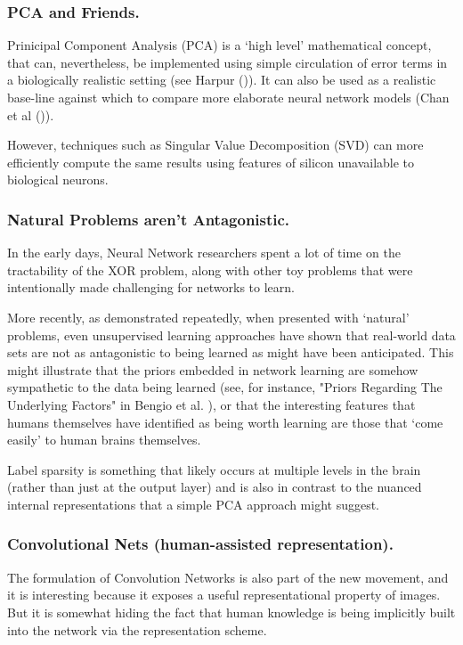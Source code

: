 \documentclass[citeauthoryear]{llncs}
\begin{document}
\subsubsection*{PCA and Friends.}

Prinicipal Component Analysis (PCA) is a `high level' mathematical concept, 
that can, nevertheless, be implemented using simple circulation of error terms
in a biologically realistic setting (see Harpur (\cite{harpur-thesis})).
It can also be used as a realistic base-line against which to compare more
elaborate neural network models (Chan et al (\cite{PCAnet})).

However, techniques such as Singular Value Decomposition (SVD) can more 
efficiently compute the same results using features of silicon unavailable to biological neurons.


\subsubsection*{Natural Problems aren't Antagonistic.}

In the early days, Neural Network researchers spent a lot of time on the 
tractability of the XOR problem, along with other toy problems that were 
intentionally made challenging for networks to learn.

More recently, as demonstrated repeatedly, when presented with `natural' problems, 
even unsupervised learning approaches have shown that real-world data sets 
are not as antagonistic to being learned as might have been anticipated.  
This might illustrate that the priors embedded in network learning are 
somehow sympathetic to the data being learned 
(see, for instance, "Priors Regarding The Underlying Factors" in Bengio et al. \cite{Bengio-et-al-2014-Book}),
or that the interesting features that humans themselves have identified as being 
worth learning are those that `come easily' to human brains themselves.

Label sparsity is something that likely occurs at multiple levels in the brain 
(rather than just at the output layer) and is also in contrast to the 
nuanced internal representations that a simple PCA approach might suggest.


\subsubsection*{Convolutional Nets (human-assisted representation).}

The formulation of Convolution Networks is also part of the new movement, 
and it is interesting because it exposes a useful representational property of images.  
But it is somewhat hiding the fact that human knowledge is being implicitly 
built into the network via the representation scheme.
\end{document}
